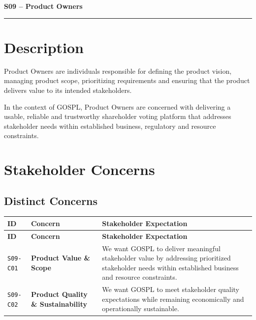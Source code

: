 \documentclass[11pt,a4paper]{article}
\begin{document}

{\LARGE\bfseries S09 -- Product Owners\par}\vspace{1em}
\noindent\rule{\linewidth}{0.4pt}

\section*{Description}

Product Owners are individuals responsible for defining the product vision, managing product scope, prioritizing requirements and ensuring that the product delivers value to its intended stakeholders.

In the context of GOSPL, Product Owners are concerned with delivering a usable, reliable and trustworthy shareholder voting platform that addresses stakeholder needs within established business, regulatory and resource constraints.

\section*{Stakeholder Concerns}

\subsection*{Distinct Concerns}

\begingroup\small
\begin{longtable}{@{}>{\raggedright\arraybackslash}p{}>{\raggedright\arraybackslash}p{}>{\raggedright\arraybackslash}p{}@{}}
\toprule
\textbf{ID} & \textbf{Concern} & \textbf{Stakeholder Expectation} \\
\midrule
\endfirsthead
\toprule
\textbf{ID} & \textbf{Concern} & \textbf{Stakeholder Expectation} \\
\midrule
\endhead
\bottomrule
\endfoot
\texttt{S09-C01} & \textbf{Product Value \& Scope} & We want GOSPL to deliver meaningful stakeholder value by addressing prioritized stakeholder needs within established business and resource constraints. \\
\addlinespace
\texttt{S09-C02} & \textbf{Product Quality \& Sustainability} & We want GOSPL to meet stakeholder quality expectations while remaining economically and operationally sustainable. \\
\end{longtable}
\endgroup
\end{document}
